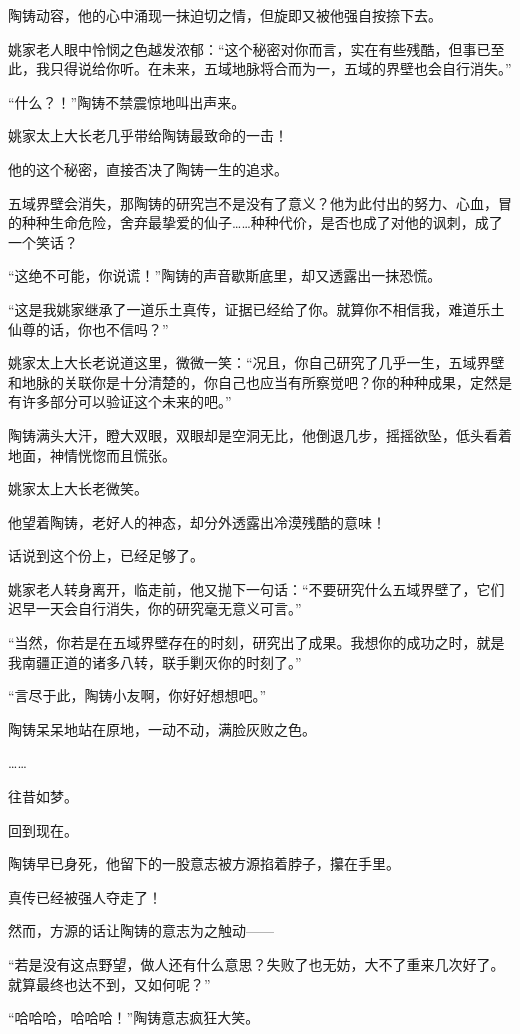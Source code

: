 \begin{this_body}
陶铸动容，他的心中涌现一抹迫切之情，但旋即又被他强自按捺下去。

姚家老人眼中怜悯之色越发浓郁：“这个秘密对你而言，实在有些残酷，但事已至此，我只得说给你听。在未来，五域地脉将合而为一，五域的界壁也会自行消失。”

“什么？！”陶铸不禁震惊地叫出声来。

姚家太上大长老几乎带给陶铸最致命的一击！

他的这个秘密，直接否决了陶铸一生的追求。

五域界壁会消失，那陶铸的研究岂不是没有了意义？他为此付出的努力、心血，冒的种种生命危险，舍弃最挚爱的仙子……种种代价，是否也成了对他的讽刺，成了一个笑话？

“这绝不可能，你说谎！”陶铸的声音歇斯底里，却又透露出一抹恐慌。

“这是我姚家继承了一道乐土真传，证据已经给了你。就算你不相信我，难道乐土仙尊的话，你也不信吗？”

姚家太上大长老说道这里，微微一笑：“况且，你自己研究了几乎一生，五域界壁和地脉的关联你是十分清楚的，你自己也应当有所察觉吧？你的种种成果，定然是有许多部分可以验证这个未来的吧。”

陶铸满头大汗，瞪大双眼，双眼却是空洞无比，他倒退几步，摇摇欲坠，低头看着地面，神情恍惚而且慌张。

姚家太上大长老微笑。

他望着陶铸，老好人的神态，却分外透露出冷漠残酷的意味！

话说到这个份上，已经足够了。

姚家老人转身离开，临走前，他又抛下一句话：“不要研究什么五域界壁了，它们迟早一天会自行消失，你的研究毫无意义可言。”

“当然，你若是在五域界壁存在的时刻，研究出了成果。我想你的成功之时，就是我南疆正道的诸多八转，联手剿灭你的时刻了。”

“言尽于此，陶铸小友啊，你好好想想吧。”

陶铸呆呆地站在原地，一动不动，满脸灰败之色。

……

往昔如梦。

回到现在。

陶铸早已身死，他留下的一股意志被方源掐着脖子，攥在手里。

真传已经被强人夺走了！

然而，方源的话让陶铸的意志为之触动——

“若是没有这点野望，做人还有什么意思？失败了也无妨，大不了重来几次好了。就算最终也达不到，又如何呢？”

“哈哈哈，哈哈哈！”陶铸意志疯狂大笑。


\end{this_body}
